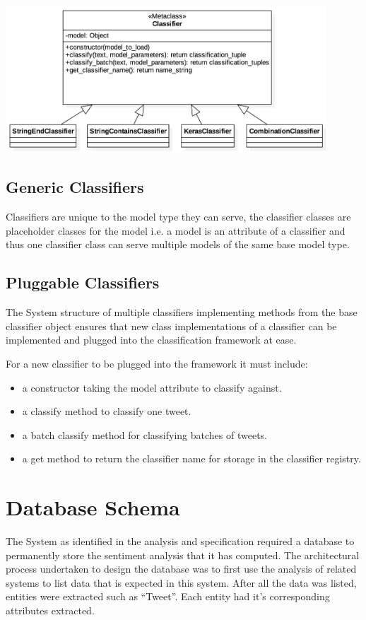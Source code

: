 \documentclass[11pt]{report}
\begin{document}
\begin{center}
  \includegraphics[width=12cm]{images/classifier-inheritance.jpg}
  \label{fig:classifier-interface}
\end{center}

\subsection*{Generic Classifiers}
Classifiers are unique to the model type they can serve, the classifier classes are placeholder classes for the model i.e. a model is an attribute of a classifier and thus one classifier class can serve multiple models of the same base model type.

\subsection*{Pluggable Classifiers}
The System structure of multiple classifiers implementing methods from the base classifier object ensures that new class implementations of a classifier can be implemented and plugged into the classification framework at ease.

For a new classifier to be plugged into the framework it must include:
\begin{itemize}
\item a constructor taking the model attribute to classify against.
\item a classify method to classify one tweet.
\item a batch classify method for classifying batches of tweets.
\item a get method to return the classifier name for storage in the classifier registry.
\end{itemize}

\section{Database Schema}
The System as identified in the analysis and specification required a database to permanently store the sentiment analysis that it has computed. The architectural process undertaken to design the database was to first use the analysis of related systems to list data that is expected in this system. After all the data was listed, entities were extracted such as ``Tweet''. Each entity had it's corresponding attributes extracted. 
\end{document}
